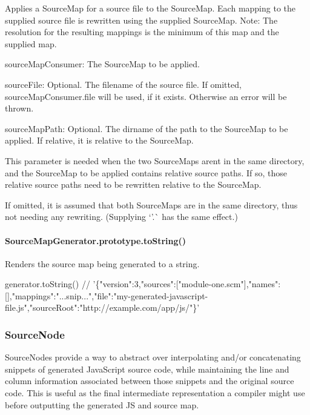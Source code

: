 Applies a Source\+Map for a source file to the Source\+Map. Each mapping to the supplied source file is rewritten using the supplied Source\+Map. Note\+: The resolution for the resulting mappings is the minimum of this map and the supplied map.


\begin{DoxyItemize}
\item {\ttfamily source\+Map\+Consumer}\+: The Source\+Map to be applied.
\item {\ttfamily source\+File}\+: Optional. The filename of the source file. If omitted, source\+Map\+Consumer.\+file will be used, if it exists. Otherwise an error will be thrown.
\item {\ttfamily source\+Map\+Path}\+: Optional. The dirname of the path to the Source\+Map to be applied. If relative, it is relative to the Source\+Map.

This parameter is needed when the two Source\+Maps aren\textquotesingle{}t in the same directory, and the Source\+Map to be applied contains relative source paths. If so, those relative source paths need to be rewritten relative to the Source\+Map.

If omitted, it is assumed that both Source\+Maps are in the same directory, thus not needing any rewriting. (Supplying `'.\textquotesingle{}\`{} has the same effect.)
\end{DoxyItemize}

\paragraph*{Source\+Map\+Generator.\+prototype.\+to\+String()}

Renders the source map being generated to a string.


\begin{DoxyCode}
generator.toString()
//
       '\{"version":3,"sources":["module-one.scm"],"names":[],"mappings":"...snip...","file":"my-generated-javascript-file.js","sourceRoot":"http://example.com/app/js/"\}'
\end{DoxyCode}


\subsubsection*{Source\+Node}

Source\+Nodes provide a way to abstract over interpolating and/or concatenating snippets of generated Java\+Script source code, while maintaining the line and column information associated between those snippets and the original source code. This is useful as the final intermediate representation a compiler might use before outputting the generated JS and source map.

